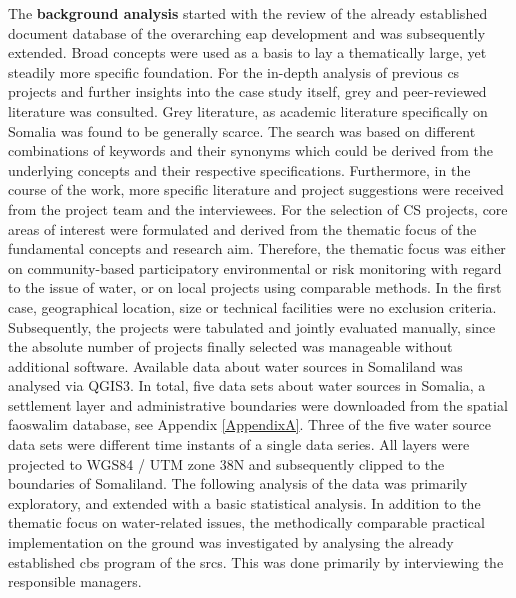 The \textbf{background analysis} started with the review of the already established document database of the overarching \acrshort{eap} development and was subsequently extended. Broad concepts were used as a basis to lay a thematically large, yet steadily more specific foundation. For the in-depth analysis of previous \acrshort{cs} projects and further insights into the case study itself, grey and peer-reviewed literature was consulted. Grey literature, as academic literature specifically on Somalia was found to be generally scarce. The search was based on different combinations of keywords and their synonyms which could be derived from the underlying concepts and their respective specifications. Furthermore, in the course of the work, more specific literature and project suggestions were received from the project team and the interviewees. For the selection of CS projects, core areas of interest were formulated and derived from the thematic focus of the fundamental concepts and research aim. Therefore, the thematic focus was either on community-based participatory environmental or risk monitoring with regard to the issue of water, or on local projects using comparable methods. In the first case, geographical location, size or technical facilities were no exclusion criteria. Subsequently, the projects were tabulated and jointly evaluated manually, since the absolute number of projects finally selected was manageable without additional software.\newline
Available data about water sources in Somaliland was analysed via QGIS3. In total, five data sets about water sources in Somalia, a settlement layer and administrative boundaries were downloaded from the spatial \acrshort{fao}\acrshort{swalim} database, see Appendix \ref{AppendixA}. Three of the five water source data sets were different time instants of a single data series. All layers were projected to WGS84 / UTM zone 38N and subsequently clipped to the boundaries of Somaliland. The following analysis of the data was primarily exploratory, and extended with a basic statistical analysis.\newline 
In addition to the thematic focus on water-related issues, the methodically comparable practical implementation on the ground was investigated by analysing the already established \acrshort{cbs} program of the \acrshort{srcs}. This was done primarily by interviewing the responsible managers.

